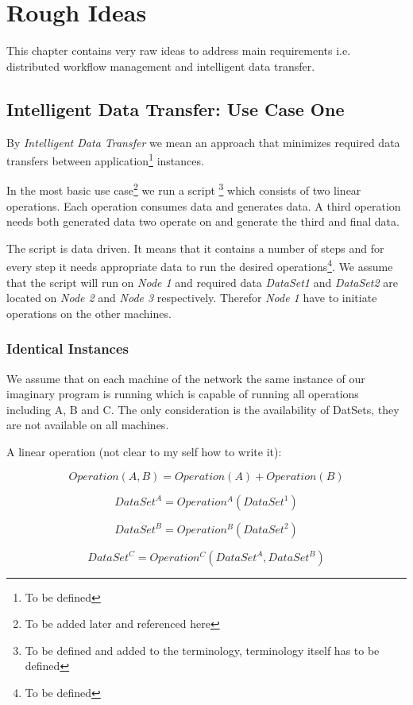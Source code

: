 \chapter{Rough Ideas}

This chapter contains very raw ideas to address main requirements i.e.
distributed workflow management and intelligent data transfer.

\section{Intelligent Data Transfer: Use Case One}
By \textit{Intelligent Data Transfer} we mean an approach that
minimizes required data transfers between application\footnote{To be defined}
instances.

In the most basic use case\footnote{To be added later and 
referenced here} we run a script
\footnote{To be defined and added to
the terminology, terminology itself has to be defined}
which consists of two linear operations. Each operation consumes data
and generates data. A third operation needs both generated data two 
operate on and generate the third and final data.

The script is data driven. It means that it contains a number
of steps and for every step it needs appropriate data to run the
desired operations\footnote{To be defined}. We assume that
the script will run on \textit{Node 1} and required data 
\textit{DataSet1} and \textit{DataSet2} are 
located on \textit{Node 2}
and \textit{Node 3} respectively. Therefor \textit{Node 1} have
to initiate operations on the other machines.

\subsection{Identical Instances}
We assume that on each machine of the network the same instance of our
imaginary program is running which is capable of running all operations
including A, B and C. The only consideration is the availability of 
DatSets, they are not available on all machines.

A linear operation (not clear to my self how to write it):

\[ Operation(A, B) = Operation(A) + Operation(B) \]

\[ DataSet^A = Operation^A(DataSet^1) \]

\[ DataSet^B = Operation^B(DataSet^2) \]

\[ DataSet^C = Operation^C(DataSet^A, DataSet^B) \]

